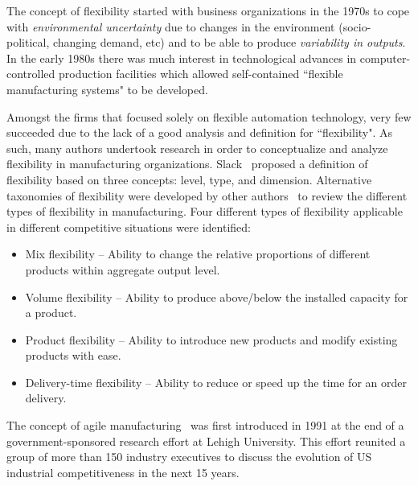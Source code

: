 \documentclass[final,3p,12pt]{elsarticle}
\begin{document}
The concept of flexibility started with business organizations in the 1970s to cope with \textit{environmental uncertainty} due to changes in the environment (socio-political, changing demand, etc) and to be able to produce \textit{variability in outputs}. In the early 1980s there was much interest in technological advances in computer-controlled production facilities which allowed self-contained ``flexible manufacturing systems" to be developed.

Amongst the firms that focused solely on flexible automation technology, very few succeeded due to the lack of a good analysis and definition for ``flexibility". As such, many authors undertook research in order to conceptualize and analyze flexibility in manufacturing organizations. Slack~\cite{Slack.1988,Slack.1983} proposed a definition of flexibility based on three concepts: level, type, and dimension. Alternative taxonomies of flexibility were developed by other authors~\cite{Gervin.1987,Buzacott.1982,Mandelbaum.1978,Slack.1988,Slack.1983,Browne.1984,Jaikumar.HBR.1986} to review the different types of flexibility in manufacturing. Four different types of flexibility applicable in different competitive situations were identified:

\begin{itemize}
\item Mix flexibility -- Ability to change the relative proportions of different products within aggregate output level.
\item Volume flexibility -- Ability to produce above/below the installed capacity for a product.
\item Product flexibility -- Ability to introduce new products and modify existing products with ease.
\item Delivery-time flexibility -- Ability to reduce or speed up the time for an order delivery.
\end{itemize}

The concept of agile manufacturing~\cite{SHERIDAN.1993,Struebing.1995,NAGEL.1991} was first introduced in 1991 at the end of a government-sponsored research effort at Lehigh University. This effort reunited a group of more than 150 industry executives to discuss the evolution of US industrial competitiveness in the next 15 years.
\end{document}
